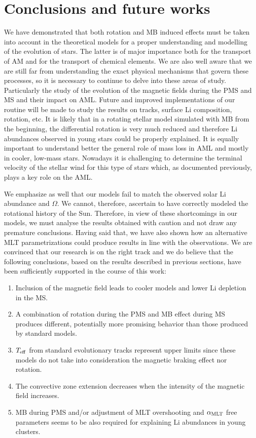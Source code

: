 \documentclass[fleqn,usenatbib]{mnras}
\begin{document}
\section{Conclusions and future works} \label{sec_4}
We have demonstrated that both rotation and MB induced effects must be taken into account in the theoretical models for a proper understanding and modelling of the evolution of stars. The latter is of major importance both for the transport of AM and for the transport of chemical elements. We are also well aware that we are still far from understanding the exact physical mechanisms that govern these processes, so it is necessary to continue to delve into these areas of study. Particularly the study of the evolution of the magnetic fields during the PMS and MS and their impact on AML. Future and improved implementations of our routine will be made to study the results on tracks, surface Li composition, rotation, etc. It is likely that in a rotating stellar model simulated with MB from the beginning, the differential rotation is very much reduced and therefore Li abundances observed in young stars could be properly explained. It is equally important to understand better the general role of mass loss in AML and mostly in cooler, low-mass stars. Nowadays it is challenging to determine the terminal velocity of the stellar wind for this type of stars which, as documented previously, plays a key role on the AML.\par

We emphasize as well that our models fail to match the observed solar Li abundance and $\Omega$. We cannot, therefore, ascertain to have correctly modeled the rotational history of the Sun. Therefore, in view of these shortcomings in our models, we must analyse the results obtained with caution and not draw any premature conclusions. Having said that, we have also shown how an alternative MLT parametrizations could produce results in line with the observations. We are convinced that our research is on the right track and we do believe that the following conclusions, based on the results described in previous sections, have been sufficiently supported in the course of this work:
\begin{enumerate}
    \item Inclusion of the magnetic field leads to cooler models and lower Li depletion in the MS.
    \item A combination of rotation during the PMS and MB effect during MS produces different, potentially more promising behavior than those produced by standard models.
    \item $T_{\mathrm{eff}}$ from standard evolutionary tracks represent upper limits since these models do not take into consideration the magnetic braking effect nor rotation.
    \item The convective zone extension decreases when the intensity of the magnetic field increases.
    \item MB during PMS and/or adjustment of MLT overshooting and $\alpha_{\mathrm{MLT}}$ free parameters seems to be also required for explaining Li abundances in young clusters.
\end{enumerate}
\end{document}
